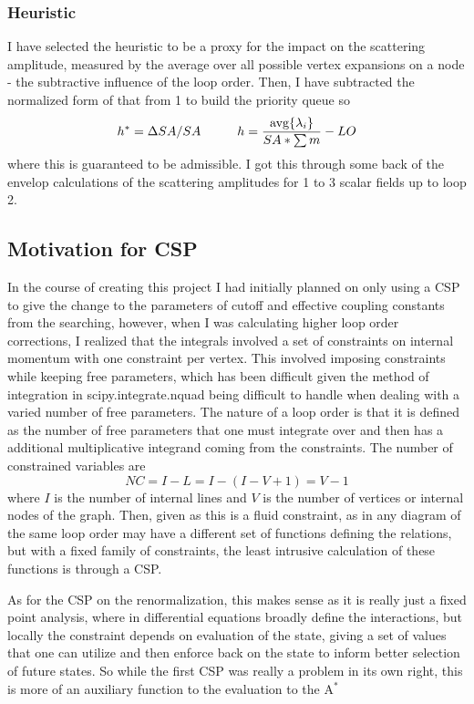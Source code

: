 \documentclass{article}
\begin{document}
\subsubsection{Heuristic}
\hspace{0.5 cm} I have selected the heuristic to be a proxy for the impact on the scattering amplitude, measured by the average over all possible vertex expansions on a node - the subtractive influence of the loop order. Then, I have subtracted the normalized form of that from 1 to build the priority queue so 
\begin{equation}
	h^* = \Delta SA/SA \hspace{1 cm} h= \frac{ \textrm{avg}\{\lambda_i\}}{SA * \sum m} -LO 
\end{equation}
	where this is guaranteed to be admissible. I got this through some back of the envelop calculations of the scattering amplitudes for 1 to 3 scalar fields up to loop 2. 
\subsection{Motivation for CSP}
\hspace{0.5 cm} In the course of creating this project I had initially planned on only using a CSP to give the change to the parameters of cutoff and effective coupling constants from the searching, however, when I was calculating higher loop order corrections, I realized that the integrals involved a set of constraints on internal momentum with one constraint per vertex. This involved imposing constraints while keeping free parameters, which has been difficult given the method of integration in scipy.integrate.nquad being difficult to handle when dealing with a varied number of free parameters. The nature of a loop order is that it is defined as the number of free parameters that one must integrate over and then has a additional multiplicative integrand coming from the constraints. The number of constrained variables are 
\begin{equation}
	NC=I-L = I-(I-V+1)= V-1
\end{equation}
where $I$ is the number of internal lines and $V$ is the number of vertices or internal nodes of the graph. 
Then, given as this is a fluid constraint, as in any diagram of the same loop order may have a different set of functions defining the relations, but with a fixed family of constraints, the least intrusive calculation of these functions is through a CSP.

\hspace{0.5 cm}As for the CSP on the renormalization, this makes sense as it is really just a fixed point analysis, where in differential equations broadly define the interactions, but locally the constraint depends on evaluation of the state, giving a set of values that one can utilize and then enforce back on the state to inform better selection of future states. So while the first CSP was really a problem in its own right, this is more of an auxiliary function to the evaluation to the A$^*$
\end{document}
